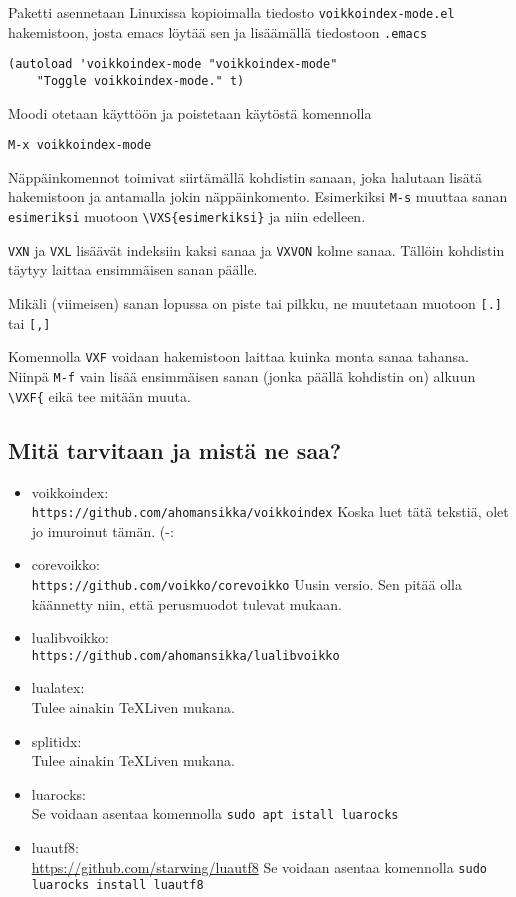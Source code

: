\documentclass[12pt]{article}
\begin{document}
Paketti asennetaan Linuxissa kopioimalla tiedosto
\verb=voikkoindex-mode.el= hakemistoon, josta emacs löytää sen ja
lisäämällä tiedostoon \verb=.emacs=

\begin{verbatim}
(autoload 'voikkoindex-mode "voikkoindex-mode"
    "Toggle voikkoindex-mode." t)
\end{verbatim}

Moodi otetaan käyttöön ja poistetaan käytöstä komennolla

\verb=M-x voikkoindex-mode=

Näppäinkomennot toimivat siirtämällä kohdistin sanaan, joka halutaan
lisätä hakemistoon ja antamalla jokin näppäinkomento. Esimerkiksi
\verb=M-s= muuttaa sanan \verb=esimeriksi= muotoon
\verb=\VXS{esimerkiksi}= ja niin edelleen.

\verb=VXN= ja \verb=VXL= lisäävät indeksiin kaksi sanaa ja
\verb=VXVON= kolme sanaa. Tällöin kohdistin täytyy laittaa ensimmäisen
sanan päälle.

Mikäli (viimeisen) sanan lopussa on piste tai pilkku, ne muutetaan muotoon
\verb=[.]= tai \verb=[,]=

Komennolla \verb=VXF= voidaan hakemistoon laittaa kuinka monta sanaa
tahansa. Niinpä \verb=M-f= vain lisää ensimmäisen sanan (jonka päällä
kohdistin on) alkuun \verb=\VXF{= eikä tee mitään muuta.


\newpage
\subsection*{Mitä tarvitaan ja mistä ne saa?}

\begin{itemize}
\item voikkoindex: \\
      \verb=https://github.com/ahomansikka/voikkoindex=
      Koska luet tätä tekstiä, olet jo imuroinut tämän. (-:

\item corevoikko: \\
      \verb=https://github.com/voikko/corevoikko=
      Uusin versio. Sen pitää olla käännetty niin, että perusmuodot
      tulevat mukaan.

\item lualibvoikko: \\
      \verb=https://github.com/ahomansikka/lualibvoikko=

\item lualatex: \\
      Tulee ainakin TeXLiven mukana.

\item splitidx: \\
      Tulee ainakin TeXLiven mukana.

\item luarocks: \\
      Se voidaan asentaa komennolla
      \verb=sudo apt istall luarocks=

\item luautf8: \\
      \url{https://github.com/starwing/luautf8}
      Se voidaan asentaa komennolla
      \verb=sudo luarocks install luautf8=
\end{itemize}
\end{document}
